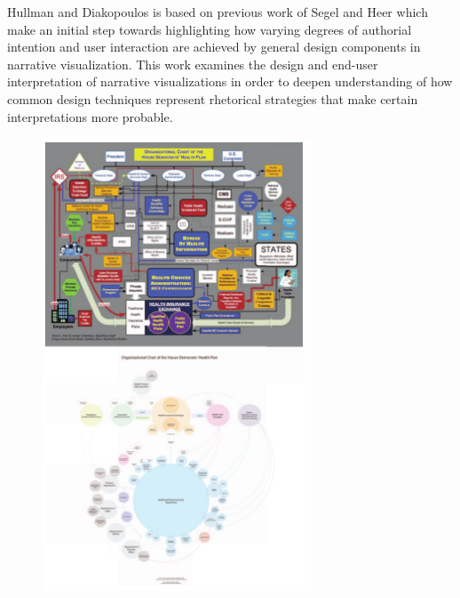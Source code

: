 \documentclass{egpubl}
\begin{document}
Hullman and Diakopoulos is based on previous work of Segel and Heer \cite{Heer1} which make an initial step towards highlighting how varying degrees of authorial intention and user interaction are achieved by general design components in narrative visualization. This work examines the design and end-user interpretation of narrative visualizations in order to deepen understanding of how common design techniques represent rhetorical strategies that make certain interpretations more probable.
\begin{figure}
\begingroup
\centering
\includegraphics[width=8cm]{./images/vis_rhetoric}
\label{fig:vis_rhetoric}
\endgroup
\end{figure}
\end{document}
